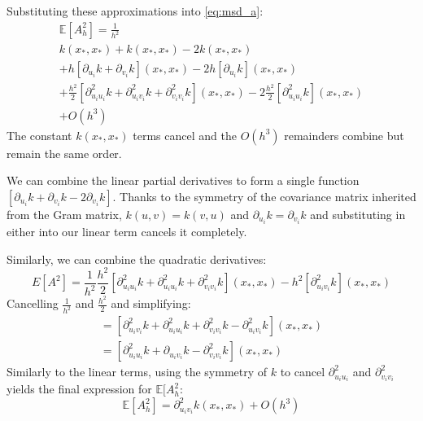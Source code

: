 Substituting these approximations into \ref{eq:msd_a}:
\begin{equation*}
    \begin{aligned}
        \mathbb{E}[A^2_h] = \frac{1}{h^2} \\
        k(x_*, x_*) + k(x_*, x_*) - 2k(x_*, x_*) \\
        + h [\partial_{u_i}k + \partial_{v_i}k](x_*, x_*) - 2h[\partial_{u_i}k](x_*, x_*) \\
        + \frac{h^2}{2} [\partial_{u_i u_i}^2 k + \partial_{u_i v_i}^2 k + \partial_{v_i v_i}^2 k](x_*, x_*) - 2\frac{h^2}{2} [\partial_{u_i u_i}^2k](x_*, x_*) \\
        + O(h^3)
    \end{aligned}
\end{equation*}
The constant $k(x_*, x_*)$ terms cancel and the $O(h^3)$ remainders combine but remain the same order. 

We can combine the linear partial derivatives to form a single function $[\partial_{u_i}k + \partial_{v_i}k - 2\partial_{v_i}k]$. Thanks to the symmetry of the covariance matrix inherited from the Gram matrix, $k(u,v) = k(v,u)$ and $\partial_{u_i}k = \partial_{v_i}k$ and substituting in either into our linear term cancels it completely. 

Similarly, we can combine the quadratic derivatives:
\begin{equation*}
    E[A^2] = \frac{1}{h^2} \frac{h^2}{2}[\partial_{u_i u_i}^2 k + \partial_{u_i u_i}^2 k + \partial_{v_i v_i}^2k](x_*,x_*) - h^2[\partial_{u_i v_i}^2 k](x_*, x_*)
\end{equation*}
Cancelling $\frac{1}{h^2}$ and $\frac{h^2}{2}$ and simplifying:
\begin{equation*}
    \begin{aligned}
    = [\partial_{u_i v_i}^2 k + \partial_{u_i u_i}^2 k + \partial_{v_i v_i}^2k - \partial_{u_i v_i}^2 k](x_*, x_*) \\
    = [\partial_{u_i u_i}^2 k + \partial_{u_i v_i}k - \partial_{v_i v_i}^2 k](x_*, x_*)
    \end{aligned}
\end{equation*}
Similarly to the linear terms, using the symmetry of $k$ to cancel $\partial_{u_i u_i}^2$ and $\partial_{v_i v_i}^2$ yields the final expression for $\mathbb{E}[A_h^2$:
\begin{equation} \label{eq:msd_a_final}
    \mathbb{E}[A_h^2] = \partial_{u_i v_i}^2 k(x_*,x_*) + O(h^3) 
\end{equation}

